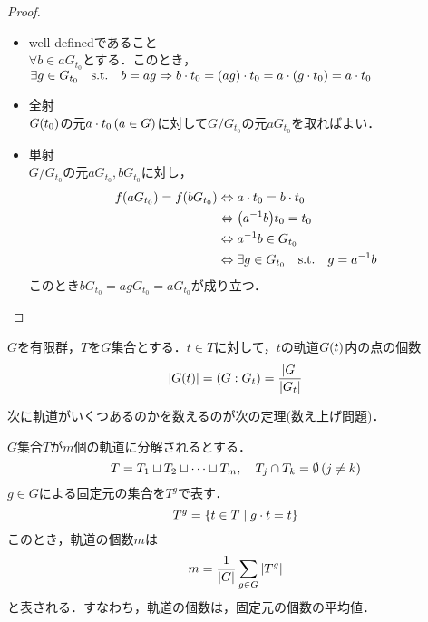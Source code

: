 \documentclass[main]{subfiles}
\begin{document}
	\begin{proof}
		\begin{itemize}
			\item well-definedであること\\$\forall b\in aG_{t_0}$とする．このとき，$\exists g\in G_{t_0}\text{\quad s.t.\quad} b=ag\Rightarrow b\cdot t_0=\qty(ag)\cdot t_0=a\cdot\qty(g\cdot t_0)=a\cdot t_0$
			\item 全射\\$G\qty(t_0)$の元$a\cdot t_0\,\qty(a\in G)$に対して$G/G_{t_0}$の元$aG_{t_0}$を取ればよい．
			\item 単射\\$G/G_{t_0}$の元$aG_{t_0},bG_{t_0}$に対し，
					\begin{align*}
						\bar{f}\qty(aG_{t_0})=\bar{f}\qty(bG_{t_0}) & \Leftrightarrow a\cdot t_0=b\cdot t_0                  \\
						                                            & \Leftrightarrow \qty(a^{-1}b)t_0=t_0                   \\
						                                            & \Leftrightarrow a^{-1}b\in G_{t_0}                     \\
						                                            & \Leftrightarrow\exists g\in G_{t_0}\text{\quad s.t.\quad} g=a^{-1}b
					\end{align*}
					このとき$bG_{t_0}=agG_{t_0}=aG_{t_0}$が成り立つ．
		\end{itemize}
	\end{proof}
	\begin{cor}\label{cor:6-3}
		$G$を有限群，$T$を$G$集合とする．$t\in T$に対して，$t$の軌道$G\qty(t)$内の点の個数
		\[\qty|G\qty(t)|=\qty(G:G_t)=\frac{\qty|G|}{\qty|G_t|}\]
	\end{cor}
	次に軌道がいくつあるのかを数えるのが次の定理(数え上げ問題)．
	\begin{thm}
		$G$集合$T$が$m$個の軌道に分解されるとする．
		\[T=T_1\sqcup T_2\sqcup\cdots\sqcup T_m,\quad T_j\cap T_k=\emptyset\,\qty(j\neq k)\]
		$g\in G$による固定元の集合を$T^g$で表す．
		\[T^g=\qty{t\in T\mid g\cdot t=t}\]
		このとき，軌道の個数$m$は
		\[m=\frac{1}{\qty|G|}\sum_{g\in G}\qty|T^g|\]
		と表される．すなわち，軌道の個数は，固定元の個数の平均値．
	\end{thm}
\end{document}
